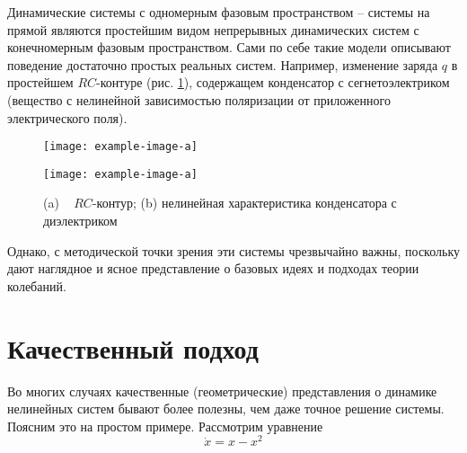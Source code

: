 	Динамические системы с одномерным фазовым пространством – системы
на прямой являются простейшим видом непрерывных динамических систем с
конечномерным фазовым пространством. Сами по себе такие модели
описывают поведение достаточно простых реальных систем. Например,
изменение заряда $q$ в простейшем $RC$-контуре (рис. \ref{fig:2.1}), содержащем конденсатор с сегнетоэлектриком (вещество с нелинейной зависимостью поляризации от приложенного электрического поля).
\begin{figure}[h!]
	\begin{minipage}{0.49\linewidth}
		\centering
		\texttt{[image: example-image-a]}
	\end{minipage}
	\hfill
	\begin{minipage}{0.49\linewidth}
		\centering
		\texttt{[image: example-image-a]}
	\end{minipage}
	\caption{(a) ~ $RC$-контур; (b) нелинейная характеристика конденсатора с диэлектриком}
	\label{fig:2.1}
\end{figure}

	
Однако, с методической точки зрения эти системы чрезвычайно важны,
поскольку дают наглядное и ясное представление о базовых идеях и подходах
теории колебаний.
\section{Качественный подход} %
Во многих случаях качественные (геометрические) представления о
динамике нелинейных систем бывают более полезны, чем даже точное решение
системы. Поясним это на простом примере. Рассмотрим уравнение
\begin{equation}
	\label{eq:2.1}
	\dot x = x- x^2
\end{equation}

